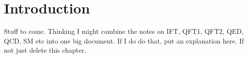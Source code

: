 \chapter{Introduction}

Stuff to come. Thinking I might combine the notes on IFT, QFT1, QFT2, QED, QCD, SM etc into one big document. If I do do that, put an explanation here. If not just delete this chapter.